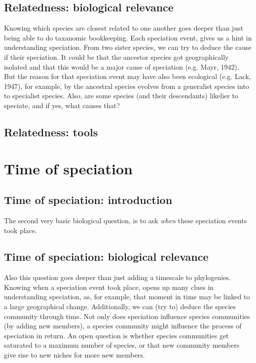 \subsection{Relatedness: biological relevance}

Knowing which species are closest related to
one another goes deeper than just
being able to do taxanomic bookkeeping. Each
speciation event, gives us a hint in understanding speciation.
From two sister species, we can try to deduce the cause
if their speciation. It could be that the ancestor species
got geographically isolated and that this would be a major
cause of speciation (e.g. Mayr, 1942). But the reason for
that speciation event may have also been ecological (e.g. Lack, 1947),
for example, by the ancestral species evolves from a generalist
species into to specialist species. Also, are some species (and their
descendants) likelier to speciate, and if yes, what causes that?

\subsection{Relatedness: tools}


\section{Time of speciation}

\subsection{Time of speciation: introduction}

The second very basic biological question, is to 
ask \emph{when} these speciation events took place.

\subsection{Time of speciation: biological relevance}

Also this question goes deeper than just 
adding a timescale to phylogenies.
Knowing when a speciation event took place,
opens up many clues in understanding speciation, as,
for example, that moment in time may be linked to a large geographical change.
Additionally, we can (try to) deduce the species community through time.
Not only does speciation influence species communities (by adding
new members), a species community might influence the process of speciation
in return. An open question is whether species communities get
saturated to a maximum number of species, or that new community members
give rise to new niches for more new members.

